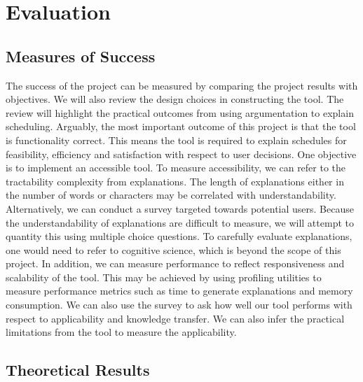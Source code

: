 \chapter{Evaluation}

\section{Measures of Success}

The success of the project can be measured by comparing the project results with objectives. We will also review the design choices in constructing the tool. The review will highlight the practical outcomes from using argumentation to explain scheduling.
\linespace
Arguably, the most important outcome of this project is that the tool is functionality correct. This means the tool is required to explain schedules for feasibility, efficiency and satisfaction with respect to user decisions.
\linespace
One objective is to implement an accessible tool. To measure accessibility, we can refer to the tractability complexity from explanations. The length of explanations either in the number of words or characters may be correlated with understandability. Alternatively, we can conduct a survey targeted towards potential users. Because the understandability of explanations are difficult to measure, we will attempt to quantity this using multiple choice questions. To carefully evaluate explanations, one would need to refer to cognitive science, which is beyond the scope of this project. In addition, we can measure performance to reflect responsiveness and scalability of the tool. This may be achieved by using profiling utilities to measure performance metrics such as time to generate explanations and memory consumption.
\linespace
We can also use the survey to ask how well our tool performs with respect to applicability and knowledge transfer. We can also infer the practical limitations from the tool to measure the applicability.

\section{Theoretical Results}

